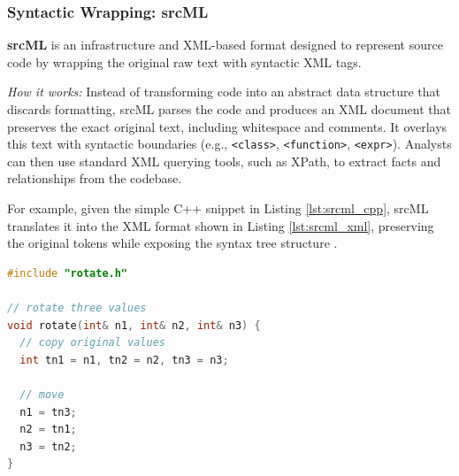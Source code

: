 \subsubsection{Syntactic Wrapping: srcML}

\textbf{srcML} \cite{collard_srcml_2016} is an infrastructure and
XML-based format designed to represent source code by wrapping the
original raw text with syntactic XML tags.

\textit{How it works:} Instead of transforming code into an abstract
data structure that discards formatting, srcML parses the code and
produces an XML document that preserves the exact original text,
including whitespace and comments. It overlays this text with
syntactic boundaries (e.g., \texttt{<class>}, \texttt{<function>},
\texttt{<expr>}). Analysts can then use standard XML querying tools,
such as XPath, to extract facts and relationships from the codebase.

For example, given the simple C++ snippet in Listing
\ref{lst:srcml_cpp}, srcML translates it into the XML format shown in
Listing \ref{lst:srcml_xml}, preserving the original tokens while
exposing the syntax tree structure \cite{srcml_about}.

\begin{lstlisting}[language=C++,caption={Example of a simple C++ function to be analyzed by srcML.},label={lst:srcml_cpp}]
#include "rotate.h"

// rotate three values
void rotate(int& n1, int& n2, int& n3) {
  // copy original values
  int tn1 = n1, tn2 = n2, tn3 = n3;

  // move
  n1 = tn3;
  n2 = tn1;
  n3 = tn2;
}
\end{lstlisting}

